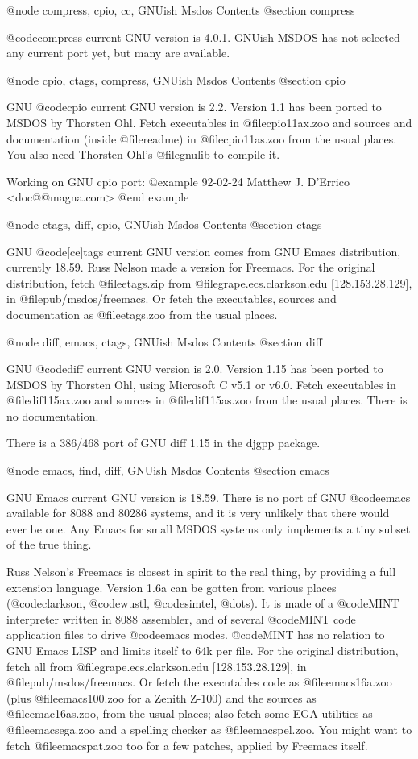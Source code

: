 @node compress, cpio, cc, GNUish Msdos Contents
@section compress

@code{compress} current GNU version is 4.0.1.  GNUish MSDOS has not
selected any current port yet, but many are available.

@node cpio, ctags, compress, GNUish Msdos Contents
@section cpio

GNU @code{cpio} current GNU version is 2.2.  Version 1.1 has been ported
to MSDOS by Thorsten Ohl.  Fetch executables in @file{cpio11ax.zoo} and
sources and documentation (inside @file{readme}) in @file{cpio11as.zoo}
from the usual places.  You also need Thorsten Ohl's @file{gnulib} to
compile it.

Working on GNU cpio port:
@example
92-02-24 Matthew J. D'Errico <doc@@magna.com> 
@end example

@node ctags, diff, cpio, GNUish Msdos Contents
@section ctags

GNU @code{[ce]tags} current GNU version comes from GNU Emacs
distribution, currently 18.59.  Russ Nelson made a version for Freemacs.
For the original distribution, fetch @file{etags.zip} from
@file{grape.ecs.clarkson.edu} [128.153.28.129], in
@file{pub/msdos/freemacs}. Or fetch the executables, sources and
documentation as @file{etags.zoo} from the usual places.

@node diff, emacs, ctags, GNUish Msdos Contents
@section diff

GNU @code{diff} current GNU version is 2.0.  Version 1.15 has been
ported to MSDOS by Thorsten Ohl, using Microsoft C v5.1 or v6.0.  Fetch
executables in @file{dif115ax.zoo} and sources in @file{dif115as.zoo}
from the usual places.  There is no documentation.

There is a 386/468 port of GNU diff 1.15 in the djgpp package.

@node emacs, find, diff, GNUish Msdos Contents
@section emacs

GNU Emacs current GNU version is 18.59.  There is no port of GNU
@code{emacs} available for 8088 and 80286 systems, and it is very
unlikely that there would ever be one.  Any Emacs for small MSDOS
systems only implements a tiny subset of the true thing.

Russ Nelson's Freemacs is closest in spirit to the real thing, by
providing a full extension language.  Version 1.6a can be gotten from
various places (@code{clarkson}, @code{wustl}, @code{simtel}, @dots{}).
It is made of a @code{MINT} interpreter written in 8088 assembler, and
of several @code{MINT} code application files to drive @code{emacs}
modes.  @code{MINT} has no relation to GNU Emacs LISP and limits itself
to 64k per file.  For the original distribution, fetch all from
@file{grape.ecs.clarkson.edu} [128.153.28.129], in
@file{pub/msdos/freemacs}. Or fetch the executables code as
@file{emacs16a.zoo} (plus @file{emacs100.zoo} for a Zenith Z-100) and
the sources as @file{emac16as.zoo}, from the usual places; also fetch
some EGA utilities as @file{emacsega.zoo} and a spelling checker as
@file{emacspel.zoo}. You might want to fetch @file{emacspat.zoo} too for
a few patches, applied by Freemacs itself.

